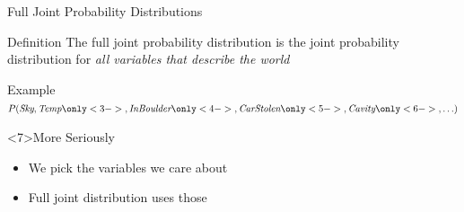 \documentclass[12pt]{beamer}
\newcommand{\EM}[1]{\mbox{\em#1}}
\begin{document}
\begin{frame}{Full Joint Probability Distributions}
	\begin{block}{Definition}
		The \alert{full joint probability distribution} is the joint probability distribution for \emph{all variables that describe the world}
	\end{block}
	\pause
	\begin{block}{Example}
		$P(\EM{Sky},\EM{Temp}
		 \only<3->{,\EM{InBoulder}
		 \only<4->{,\EM{CarStolen}
		 \only<5->{,\EM{Cavity}
		 \only<6->{,\ldots}}}})$
	\end{block}
	\begin{block}{More Seriously}
		\begin{itemize}
			\item We pick the variables we care about
			\item Full joint distribution uses those
		\end{itemize}
	\end{block}
\end{frame}
\end{document}

